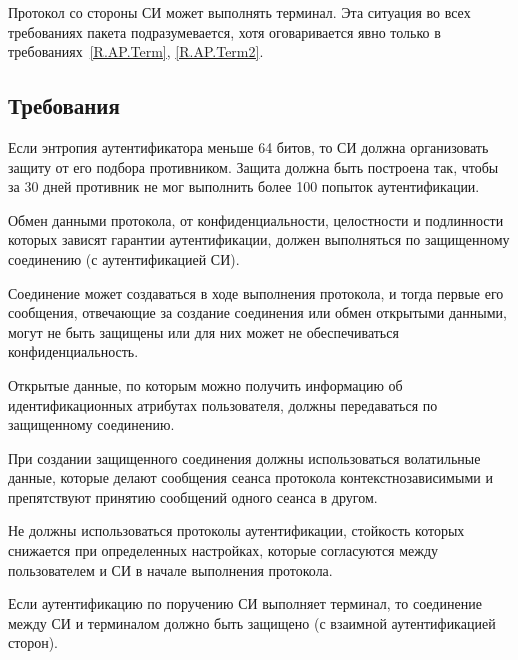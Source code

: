 Протокол со стороны СИ может выполнять терминал. Эта ситуация во всех  
требованиях пакета подразумевается, хотя оговаривается явно только в 
требованиях~\ref{R.AP.Term}, \ref{R.AP.Term2}. 

\subsection{Требования}\label{AP.Reqs}

\label{Req.AP.Attempts}
Если энтропия аутентификатора меньше 64 битов, то СИ должна организовать защиту 
от его подбора противником. Защита должна быть построена так, чтобы за 30 дней 
противник не мог выполнить более 100 попыток аутентификации.

Обмен данными протокола, от конфиденциальности, целостности и подлинности 
которых зависят гарантии аутентификации, должен выполняться по защищенному 
соединению (с аутентификацией СИ).

\begin{note*}
Соединение может создаваться в ходе выполнения протокола, и тогда
первые его сообщения, отвечающие за создание соединения или обмен открытыми 
данными, могут не быть защищены или для них может не обеспечиваться 
конфиденциальность.
\end{note*}


Открытые данные, по которым можно получить информацию об идентификационных 
атрибутах пользователя, должны передаваться по защищенному соединению.


При создании защищенного соединения должны использоваться волатильные данные,
которые делают сообщения сеанса протокола контекстнозависимыми и препятствуют 
принятию сообщений одного сеанса в другом.


Не должны использоваться протоколы аутентификации, стойкость
которых снижается при определенных настройках, которые согласуются между
пользователем и СИ в начале выполнения протокола.


\label{R.AP.Term}
Если аутентификацию по поручению СИ выполняет терминал, то соединение между СИ 
и терминалом должно быть защищено (с взаимной аутентификацией сторон).

